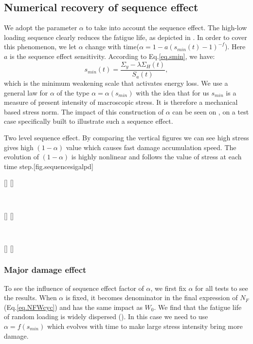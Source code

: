 \subsection{Numerical recovery of sequence effect}
We adopt the parameter $\alpha$ to take into account the sequence effect. The high-low loading sequence clearly reduces the fatigue life, as depicted in . In order to cover this phenomenon, we let $\alpha$ change with time($\alpha=1-a\left( s_{min}(t)-1\right)^{-f}$). Here $a$ is the sequence effect sensitivity. According to Eq.\eqref{eq.smin}, we have:
$$
s_{min}(t)=\dfrac{\Sigma_y-\lambda \Sigma_H(t)}{S_{a}(t)},
$$
which is the minimum weakening scale that activates energy loss.  We use a general law for $\alpha$ of the type $\alpha = \alpha (s_{min})$ with the idea that for us $s_{min}$ is a measure of present intensity of macroscopic stress. It is therefore a mechanical based stress norm. The impact of this construction of $\alpha$ can be seen on , on a test case specifically built to illustrate such a sequence effect.

\begin{Figure}[]{Two level sequence effect. By comparing the vertical figures we can see high stress gives high $(1-\alpha)$ value which causes fast damage accumulation speed. The evolution of $(1-\alpha)$ is highly nonlinear and follows the value of stress at each time step.}[fig.sequencesigalpd]
\centerline{
[]
[]}
\\
\centerline{
[]
[]}
\\
\centerline{
[]
[]}
\label{fig.sequencesigalpd}
\end{Figure}


\clearpage
\subsubsection{Major damage effect}

To see the influence of sequence effect factor of $\alpha$, we first fix $\alpha$ for all tests to see the results. When $\alpha$ is fixed, it becomes denominator in the final expression of $N_F$ (Eq.\eqref{eq.NFWcyc}) and has the same impact as $W_0$. We find  that the fatigue life of random loading is widely dispersed (). In this case we need to use $\alpha=f(s_{min})$ which evolves with time to make large stress intensity bring more damage.

